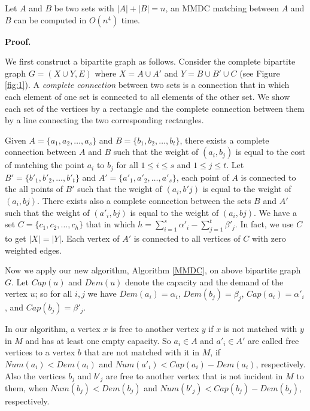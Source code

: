 \documentclass[preprint,12pt]{elsarticle}
\begin{document}
\begin{theorem}
Let $A$ and $B$ be two sets with $|A|+|B|=n$, an MMDC matching between $A$ and $B$ can be computed in $O(n^4)$ time.
\end{theorem}

\textbf {Proof.} 

We first construct a bipartite graph as follows. Consider the complete bipartite graph $G=(X \cup Y, E)$ where $X=A \cup A'$ and $Y=B \cup B' \cup C$ (see Figure \ref{fig:1}). 
A \textit {complete connection} between two sets is a connection that in which each element of one set is connected to all elements of the other set. We show each set of the vertices by a rectangle and the complete connection between them by a line connecting the two corresponding rectangles. 

Given $A= \{a_1, a_2, \dots, a_s\}$ and $B= \{b_1, b_2, \dots, b_t\}$, there exists a complete connection between $A$ and $B$ such that the weight of $(a_i, b_j)$ is equal to the cost of matching the point $a_i$ to $b_j$ for all $1 \le i \le s$ and $1 \le j \le t$. Let $B'= \{b'_1, b'_2, \dots, b'_t\}$ and $A'= \{a'_1, a'_2, \dots, a'_s\}$, each point of $A$ is connected to the all points of $B'$ such that the weight of $(a_i,b'j)$ is equal to the weight of $(a_i,bj)$. There exists also a complete connection between the sets $B$ and $A'$ such that the weight of $(a'_i,bj)$ is equal to the weight of $(a_i,bj)$. We have a set $C=\{c_1,c_2,\dots,c_h\}$ that in which $h=\sum_{i=1}^s{\alpha}'_i-\sum_{j=1}^t{\beta}'_j$. In fact, we use $C$ to get $|X|=|Y|$. Each vertex of $A'$ is connected to all vertices of $C$ with zero weighted edges. 



Now we apply our new algorithm, Algorithm \ref{MMDC}, on above bipartite graph $G$. Let $Cap(u)$ and $Dem(u)$ denote the capacity and the demand of the vertex $u$; so for all $i,j$ we have $Dem(a_i)=\alpha_i$, $Dem(b_j)=\beta_j$, $Cap(a_i)={\alpha }'_i$, and $Cap(b_j)={\beta }'_j$. 

In our algorithm, a vertex $x$ is free to another vertex $y$ if $x$ is not matched with $y$ in $M$ and has at least one empty capacity.  
So $a_i \in A$ and $a'_i \in A'$ are called free vertices to a vertex $b$ that are not matched with it in $M$, if \newline $Num(a_i)<Dem(a_i)$ and $Num(a'_i)<Cap(a_i)-Dem(a_i)$, respectively. \newline Also the vertices $b_j$ and $b'_j$ are free to another vertex that is not incident in $M$ to them, when \newline $Num(b_j)<Dem(b_j)$ and $Num(b'_j)<Cap(b_j)-Dem(b_j)$, respectively.
\end{document}
